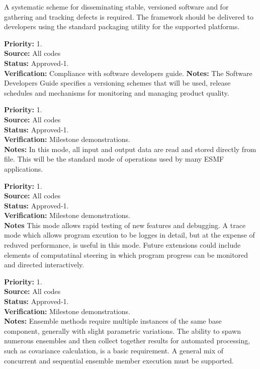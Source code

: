  A systematic scheme for disseminating
stable, versioned software and for gathering and tracking defects is required.
The framework should be delivered to developers using the standard packaging
utility for the supported platforms.
\begin{reqlist}
{\bf Priority:} 1. \\
{\bf Source:} All codes\\
{\bf Status:} Approved-1. \\
{\bf Verification:} Compliance with software developers guide.
{\bf Notes:} The Software Developers Guide specifies a versioning
schemes that will be used, release schedules and mechanisms for monitoring
and managing product quality.
\end{reqlist}

\begin{reqlist}
{\bf Priority:} 1. \\
{\bf Source:} All codes\\
{\bf Status:} Approved-1. \\
{\bf Verification:} Milestone demonstrations.\\
{\bf Notes:} In this mode, all input and output data are read and stored
directly from file. This will be the standard mode of operations used by
many ESMF applications.
\end{reqlist}

\begin{reqlist}
{\bf Priority:} 1. \\
{\bf Source:} All codes\\
{\bf Status:} Approved-1. \\
{\bf Verification:} Milestone demonstrations.\\
{\bf Notes} This mode allows rapid testing of new features and debugging.
A trace mode which allows program excution to be logges in detail,
but at the expense of reduved performance, is useful in this mode.
Future extensions could include elements of computatinal steering
in which program progress can be monitored and directed
interactively.
\end{reqlist}

\begin{reqlist}
{\bf Priority:} 1. \\
{\bf Source:} All codes\\
{\bf Status:} Approved-1. \\
{\bf Verification:} Milestone demonstrations.\\
{\bf Notes:} Ensemble methods require multiple instances of
the same base component, generally with slight parametric variations.
The ability to spawn numerous ensembles and then collect together
results for automated processing, such as covariance calculation, 
is a basic requirement. A general mix of concurrent and sequential ensemble 
member execution must be supported.
\end{reqlist}

